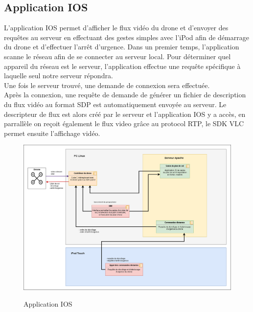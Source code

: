 \documentclass{article}
\begin{document}
     \subsection{Application IOS}
     L'application IOS permet d'afficher le flux vidéo du drone et d'envoyer des requêtes au serveur en effectuant des gestes simples avec l'iPod afin de démarrage du drone et d'effectuer l'arrêt d'urgence.
     \vspace{0.2cm}
     \newline
     Dans un premier temps, l'application scanne le réseau afin de se connecter au serveur local.
     Pour déterminer quel appareil du réseau est le serveur, l'application effectue une requête spécifique à laquelle seul notre serveur répondra.\\
     Une fois le serveur trouvé, une demande de connexion sera effectuée.\\
     Après la connexion, une requête de demande de générer un fichier de description du flux vidéo au format SDP est automatiquement envoyée au serveur.
     \vspace{0.2cm}
     \newline
     Le descripteur de flux est alors créé par le serveur et l'application IOS y a accès, en parrallèle on reçoit également le flux video grâce au protocol RTP, le SDK VLC permet ensuite l'affichage vidéo.
        \vspace*{0.3cm}
	    \begin{center}
		\begin{figure}[!h]
		\includegraphics[scale=0.4]{03_archi_logicielle_iPod.png}\\
		\caption{Application IOS}
		\end{figure}
        \end{center}
        
\end{document}
